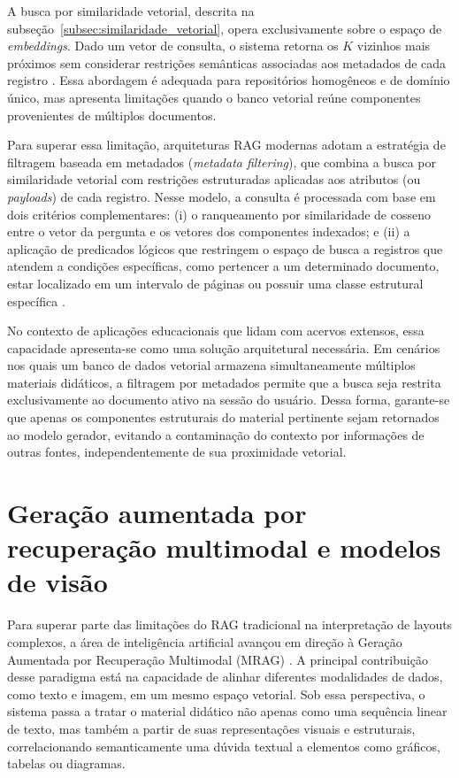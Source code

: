 A busca por similaridade vetorial, descrita na subseção~\ref{subsec:similaridade_vetorial}, opera exclusivamente sobre o espaço de \textit{embeddings}. Dado um vetor de consulta, o sistema retorna os $K$ vizinhos mais próximos sem considerar restrições semânticas associadas aos metadados de cada registro . Essa abordagem é adequada para repositórios homogêneos e de domínio único, mas apresenta limitações quando o banco vetorial reúne componentes provenientes de múltiplos documentos.

Para superar essa limitação, arquiteturas RAG modernas adotam a estratégia de filtragem baseada em metadados (\textit{metadata filtering}), que combina a busca por similaridade vetorial com restrições estruturadas aplicadas aos atributos (ou \textit{payloads}) de cada registro. Nesse modelo, a consulta é processada com base em dois critérios complementares: (i) o ranqueamento por similaridade de cosseno entre o vetor da pergunta e os vetores dos componentes indexados; e (ii) a aplicação de predicados lógicos que restringem o espaço de busca a registros que atendem a condições específicas, como pertencer a um determinado documento, estar localizado em um intervalo de páginas ou possuir uma classe estrutural específica .
 
No contexto de aplicações educacionais que lidam com acervos extensos, essa capacidade apresenta-se como uma solução arquitetural necessária. Em cenários nos quais um banco de dados vetorial armazena simultaneamente múltiplos materiais didáticos, a filtragem por metadados permite que a busca seja restrita exclusivamente ao documento ativo na sessão do usuário. Dessa forma, garante-se que apenas os componentes estruturais do material pertinente sejam retornados ao modelo gerador, evitando a contaminação do contexto por informações de outras fontes, independentemente de sua proximidade vetorial.
 

\section{Geração aumentada por recuperação multimodal e modelos de visão}
\label{sec:rag_multimodal}

Para superar parte das limitações do RAG tradicional na interpretação de layouts complexos, a área de inteligência artificial avançou em direção à Geração Aumentada por Recuperação Multimodal (MRAG) . A principal contribuição desse paradigma está na capacidade de alinhar diferentes modalidades de dados, como texto e imagem, em um mesmo espaço vetorial. Sob essa perspectiva, o sistema passa a tratar o material didático não apenas como uma sequência linear de texto, mas também a partir de suas representações visuais e estruturais, correlacionando semanticamente uma dúvida textual a elementos como gráficos, tabelas ou diagramas.

